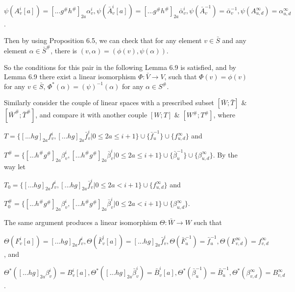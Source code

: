 \def\CTEXPreproc{Created by ctex v0.2.12, don't edit!}\documentclass[11pt]{article}
\begin{document}
\begin{pf}
       $\psi( A^i _{v}[a] )=[...g^{\#}h^{\#}]_{2a}\alpha^i _v , \psi(\bar{A}^i _{v}[a])=[...g^{\#}h^{\#}]_{2a}\bar{\alpha}^i _v , \psi (\bar{A}^{-1}_v )= \bar{\alpha}^{-1}_v , \psi ( A^{\infty}_{u,d}  )= \alpha^{\infty}_{u,d} $.

       Then by using Proposition 6.5, we can check that for any element $v \in \bar{S} $ and any element $\alpha \in  \bar{S}^{\#}$, there is
 $ (  v, \alpha  )= ( \phi(v) ,\psi(\alpha)    )  $.

       So the conditions for this pair in the following Lemma 6.9 is satisfied, and by Lemma 6.9 there exist a linear isomorphism
       $\Phi: \bar{V}\rightarrow V$, such that
       $\Phi (v) = \phi (v)  $ for any $v \in \bar{S}$, $\Phi^{*}( \alpha )= (\psi)^{-1} ( \alpha) $ for any $\alpha \in S^{\#}  $.


       Similarly consider the couple of linear spaces with a prescribed subset $[\bar{W};  \bar{T} ]$ $\&$ $[\bar{W}^{\#}; \bar{T}^{\#}]$, and compare it with another couple $[W; T ]$ $\&$ $[W^{\#}; T^{\#}]$, where

       $T= \{ [...hg]_{2a}f^{i}_{v}, [...hg]_{2a}\bar{f}^{i}_{v}| 0\leq 2a \leq i+1 \} \cup \{ \bar{f}^{-1}_u \} \cup  \{ f^{\infty}_{u,d} \} $ and

       $T^{\#}=\{ [...h^{\#} g^{\#}]_{2a} \beta^{i}_{v}, [...h^{\#} g^{\#}]_{2a}\bar{\beta}^{i}_{v}| 0\leq 2a \leq i+1 \} \cup \{  \bar{\beta}^{-1}_u \}  \cup \{ \beta^{\infty}_{u,d} \}  $. By the way let

        $T_0 = \{ [...hg]_{2a} f^{i}_{v}, [...hg]_{2a}\bar{f}^{i}_{v}| 0\leq 2a < i+1 \}  \cup  \{ f^{\infty}_{u,d} \} $ and

        $T^{\#}_0 =\{ [...h^{\#}g^{\#}]_{2a}\beta^{i}_{v},[...h^{\#}g^{\#}]_{2a} \bar{\beta}^{i}_{v}| 0\leq 2a < i+1 \}  \cup \{ \beta^{\infty}_{u,d} \}  $.


        The same argument produces a linear isomorphism $\Theta: \bar{W} \rightarrow W $ such that

       $\Theta(  F^i _v [a]  )= [...hg]_{2a} f^i _v ,  \Theta(\bar{F}^i _v [a])= [...hg]_{2a} \bar{f}^i _v   ,
        \Theta ( \bar{F}^{-1}_u  )= \bar{f}^{-1}_u  , \Theta (  F^{\infty} _{v,d} )= f^{\infty}_{v,d} $, and


       $\Theta^{*}([...hg    ]_{2a} \beta^i _v    )= B^i _v [a] , \Theta^{*}([...hg    ]_{2a} \bar{\beta}^i _v    )= \bar{B}^i _v [a] ,
        \Theta^{*} ( \bar{\beta}^{-1} _u    )= \bar{B}^{-1}_u , \Theta^{*}( \beta^{\infty}_{v,d}  )= B^{\infty}_{v,d} $.\\


\end{pf}
\end{document}

